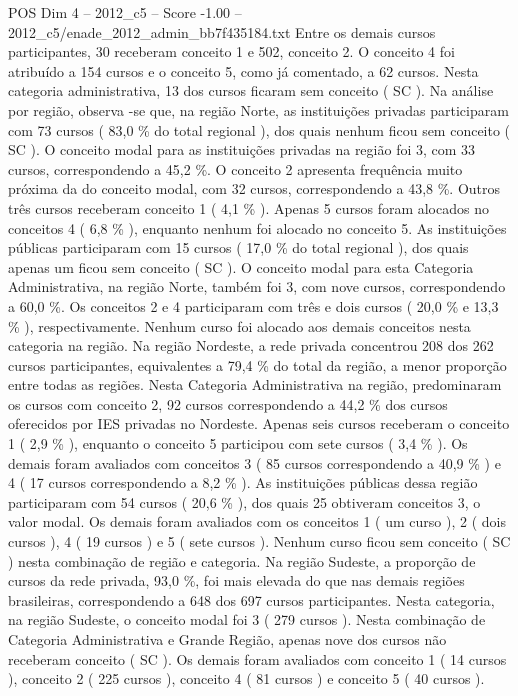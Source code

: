 \begin{textsample}{POS Dim 4 – 2012\_c5 – Score -1.00 – 2012\_c5/enade\_2012\_admin\_bb7f435184.txt}
Entre os demais cursos participantes, 30 receberam conceito 1 e 502, conceito 2.
O conceito 4 foi atribuído a 154 cursos e o conceito 5, como já comentado, a 62 cursos.
Nesta categoria administrativa, 13 dos cursos ficaram sem conceito ( SC ).
Na análise por região, observa -se que, na região Norte, as instituições privadas participaram com 73 cursos ( 83,0 \% do total regional ), dos quais nenhum ficou sem conceito ( SC ).
O conceito modal para as instituições privadas na região foi 3, com 33 cursos, correspondendo a 45,2 \%.
O conceito 2 apresenta frequência muito próxima da do conceito modal, com 32 cursos, correspondendo a 43,8 \%.
Outros três cursos receberam conceito 1 ( 4,1 \% ).
Apenas 5 cursos foram alocados no conceitos 4 ( 6,8 \% ), enquanto nenhum foi alocado no conceito 5.
As instituições públicas participaram com 15 cursos ( 17,0 \% do total regional ), dos quais apenas um ficou sem conceito ( SC ).
O conceito modal para esta Categoria Administrativa, na região Norte, também foi 3, com nove cursos, correspondendo a 60,0 \%.
Os conceitos 2 e 4 participaram com três e dois cursos ( 20,0 \% e 13,3 \% ), respectivamente.
Nenhum curso foi alocado aos demais conceitos nesta categoria na região.
Na região Nordeste, a rede privada concentrou 208 dos 262 cursos participantes, equivalentes a 79,4 \% do total da região, a menor proporção entre todas as regiões.
Nesta Categoria Administrativa na região, predominaram os cursos com conceito 2, 92 cursos correspondendo a 44,2 \% dos cursos oferecidos por IES privadas no Nordeste.
Apenas seis cursos receberam o conceito 1 ( 2,9 \% ), enquanto o conceito 5 participou com sete cursos ( 3,4 \% ).
Os demais foram avaliados com conceitos 3 ( 85 cursos correspondendo a 40,9 \% ) e 4 ( 17 cursos correspondendo a 8,2 \% ).
As instituições públicas dessa região participaram com 54 cursos ( 20,6 \% ), dos quais 25 obtiveram conceitos 3, o valor modal.
Os demais foram avaliados com os conceitos 1 ( um curso ), 2 ( dois cursos ), 4 ( 19 cursos ) e 5 ( sete cursos ).
Nenhum curso ficou sem conceito ( SC ) nesta combinação de região e categoria.
Na região Sudeste, a proporção de cursos da rede privada, 93,0 \%, foi mais elevada do que nas demais regiões brasileiras, correspondendo a 648 dos 697 cursos participantes.
Nesta categoria, na região Sudeste, o conceito modal foi 3 ( 279 cursos ).
Nesta combinação de Categoria Administrativa e Grande Região, apenas nove dos cursos não receberam conceito ( SC ).
Os demais foram avaliados com conceito 1 ( 14 cursos ), conceito 2 ( 225 cursos ), conceito 4 ( 81 cursos ) e conceito 5 ( 40 cursos ).

\end{textsample}

